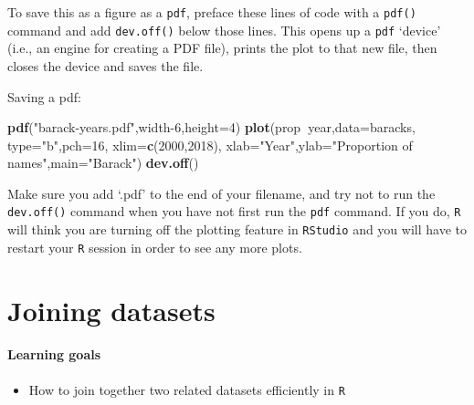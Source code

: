 \documentclass[
]{book}
\newenvironment{Shaded}{\begin{snugshade}}{\end{snugshade}}
\newcommand{\DataTypeTok}[1]{\textcolor[rgb]{0.13,0.29,0.53}{#1}}
\newcommand{\DecValTok}[1]{\textcolor[rgb]{0.00,0.00,0.81}{#1}}
\newcommand{\KeywordTok}[1]{\textcolor[rgb]{0.13,0.29,0.53}{\textbf{#1}}}
\newcommand{\NormalTok}[1]{#1}
\newcommand{\OperatorTok}[1]{\textcolor[rgb]{0.81,0.36,0.00}{\textbf{#1}}}
\newcommand{\StringTok}[1]{\textcolor[rgb]{0.31,0.60,0.02}{#1}}
\providecommand{\tightlist}{%
  \setlength{\itemsep}{0pt}\setlength{\parskip}{0pt}}
\begin{document}
To save this as a figure as a \texttt{pdf}, preface these lines of code with a \texttt{pdf()} command and add \texttt{dev.off()} below those lines. This opens up a \texttt{pdf} `device' (i.e., an engine for creating a PDF file), prints the plot to that new file, then closes the device and saves the file.

Saving a pdf:

\begin{Shaded}
\begin{Highlighting}[]
\KeywordTok{pdf}\NormalTok{(}\StringTok{"barack-years.pdf"}\NormalTok{,width}\DecValTok{-6}\NormalTok{,}\DataTypeTok{height=}\DecValTok{4}\NormalTok{)}
\KeywordTok{plot}\NormalTok{(prop}\OperatorTok{~}\NormalTok{year,}\DataTypeTok{data=}\NormalTok{baracks,}
     \DataTypeTok{type=}\StringTok{"b"}\NormalTok{,}\DataTypeTok{pch=}\DecValTok{16}\NormalTok{,}
     \DataTypeTok{xlim=}\KeywordTok{c}\NormalTok{(}\DecValTok{2000}\NormalTok{,}\DecValTok{2018}\NormalTok{),}
     \DataTypeTok{xlab=}\StringTok{"Year"}\NormalTok{,}\DataTypeTok{ylab=}\StringTok{"Proportion of names"}\NormalTok{,}\DataTypeTok{main=}\StringTok{"Barack"}\NormalTok{)}
\KeywordTok{dev.off}\NormalTok{()}
\end{Highlighting}
\end{Shaded}

Make sure you add `.pdf' to the end of your filename, and try not to run the \texttt{dev.off()} command when you have not first run the \texttt{pdf} command. If you do, \texttt{R} will think you are turning off the plotting feature in \texttt{RStudio} and you will have to restart your \texttt{R} session in order to see any more plots.

\hypertarget{joining_datasets}{%
\chapter{Joining datasets}\label{joining_datasets}}

\hypertarget{learning-goals-20}{%
\subsubsection*{Learning goals}\label{learning-goals-20}}

\begin{itemize}
\tightlist
\item
  How to join together two related datasets efficiently in \texttt{R}
\end{itemize}
\end{document}
